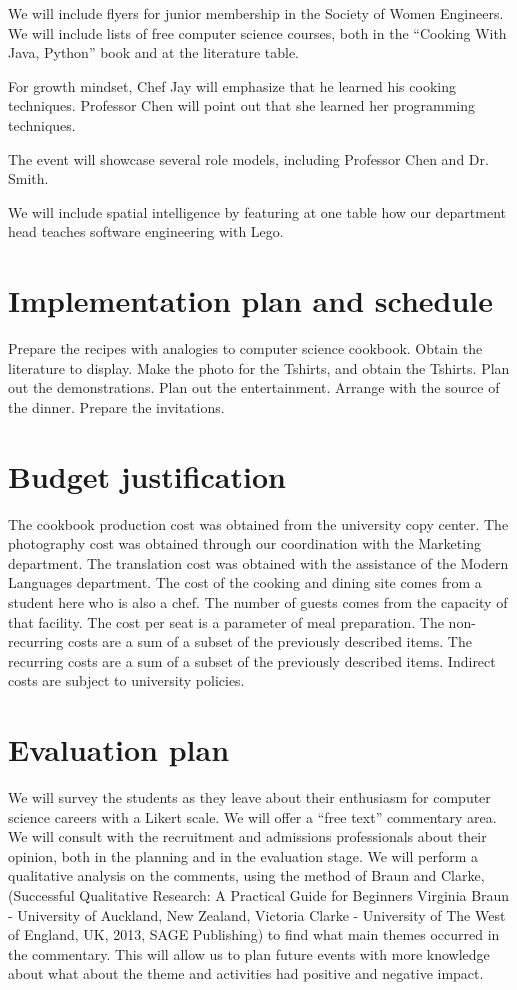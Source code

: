 \documentclass[]{article}
\begin{document}
	We will include flyers for junior membership in the Society of Women Engineers. We will include lists of free computer science 
	courses, both in the ``Cooking With Java, Python'' book and at the literature table.
	
	For growth mindset, Chef Jay will emphasize that he learned his cooking techniques. Professor Chen will point out that she learned 
	her programming techniques.
	
	The event will showcase several role models, including Professor Chen and Dr. Smith.
	
	We will include spatial intelligence by featuring at one table how our department head teaches software engineering with 
	Lego.%
	
	
	\section{Implementation plan and schedule}
	Prepare the recipes with analogies to computer science cookbook.
	Obtain the literature to display.
	Make the photo for the Tshirts, and obtain the Tshirts.
	Plan out the demonstrations.
	Plan out the entertainment.
	Arrange with the source of the dinner.
	Prepare the invitations.
	
	\section{Budget justification}
	The cookbook production cost was obtained from the university copy center.
	The photography cost was obtained through our coordination with the Marketing department.
	The translation cost was obtained with the assistance of the Modern Languages department.
	The cost of the cooking and dining site comes from a student here who is also a chef.
	The number of guests comes from the capacity of that facility.
	The cost per seat is a parameter of meal preparation.
	The non-recurring costs are a sum of a subset of the previously described items.
	The recurring costs are a sum of a subset of the previously described items.
	Indirect costs are subject to university policies.
	
	\section{Evaluation plan}
	We will survey the students as they leave about their enthusiasm for computer science careers with a Likert scale.
	We will offer a ``free text'' commentary area.
	We will consult with the recruitment and admissions professionals about their opinion, both in the planning and in the evaluation stage.
	We will perform a qualitative analysis on the comments, using the method of Braun and Clarke,(Successful Qualitative Research: 
	A Practical Guide for Beginners
	Virginia Braun - University of Auckland, New Zealand, Victoria Clarke - University of The West of England, UK, 2013, SAGE 
	Publishing) to find what main themes occurred in the commentary. This will allow us to plan future events with more knowledge 
	about what about the theme and activities had positive and negative impact.%
	
\end{document}
